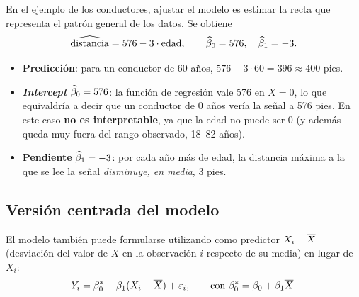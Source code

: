 \begin{ejemplo}
  En el ejemplo de los conductores, ajustar el modelo es estimar la recta que representa el
  patrón general de los datos. Se obtiene
  \[
    \widehat{\text{distancia}} = 576 - 3\cdot\text{edad},
    \qquad \widehat{\beta}_0=576,\quad \widehat{\beta}_1=-3 .
  \]
  \begin{center}
  \end{center}
  \begin{itemize}
    \item \textbf{Predicción}: para un conductor de 60 años, $576-3\cdot60=396\approx400$ pies.
    \item \textbf{\emph{Intercept}} $\widehat{\beta}_0=576$: la función de regresión vale 576 en $X=0$,
      lo que equivaldría a decir que un conductor de 0 años vería la señal a 576 pies. En este
      caso \textbf{no es interpretable}, ya que la edad no puede ser 0 (y además queda muy
      fuera del rango observado, 18--82 años).
    \item \textbf{Pendiente} $\widehat{\beta}_1=-3$: por cada año más de edad, la distancia máxima a
      la que se lee la señal \emph{disminuye, en media}, 3 pies.
  \end{itemize}
\end{ejemplo}

\subsection{Versión centrada del modelo}

El modelo también puede formularse utilizando como predictor $X_i-\overline{X}$ (desviación del
valor de $X$ en la observación $i$ respecto de su media) en lugar de $X_i$:
\[
  Y_i = \beta_0^* + \beta_1(X_i-\overline{X}) + \varepsilon_i,
  \qquad \text{con } \beta_0^* = \beta_0+\beta_1\overline{X}.
\]


